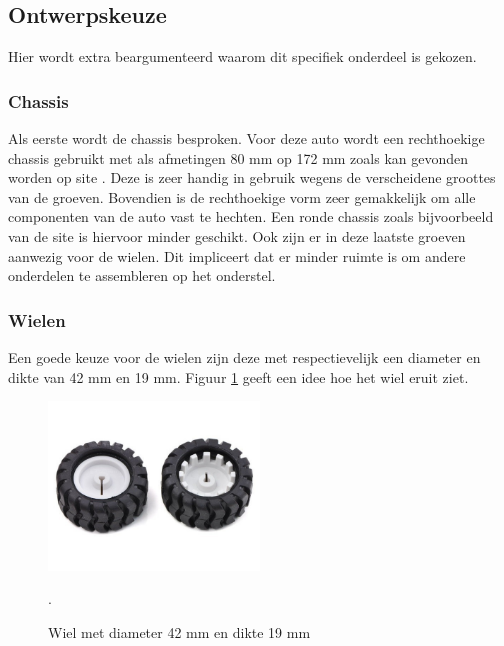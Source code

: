\documentclass[a4paper,twoside,kulak]{kulakreport} %
\begin{document}


\subsection{Ontwerpskeuze}

Hier wordt extra beargumenteerd waarom dit specifiek onderdeel is gekozen.
\label{Ontwerpskeuze}

\subsubsection{Chassis}
Als eerste wordt de chassis besproken. Voor deze auto wordt een rechthoekige chassis gebruikt met als afmetingen 80 mm op 172 mm zoals kan gevonden worden op site \cite{RobotChassisRechthoekigZwart}. %
Deze is zeer handig in gebruik wegens de verscheidene groottes van de groeven. Bovendien is de rechthoekige vorm zeer gemakkelijk om alle componenten van de auto vast te hechten. Een ronde chassis zoals bijvoorbeeld van de site \cite{RobotChassis} is hiervoor minder geschikt. Ook zijn er in deze laatste groeven aanwezig voor de wielen.%
Dit impliceert dat er minder ruimte is om andere onderdelen te assembleren op het onderstel. 
\label{Chassis}
~
\subsubsection{Wielen}
Een goede keuze voor de wielen zijn deze met respectievelijk een diameter en dikte van 42 mm en 19 mm.
Figuur \ref{fig:wiel} geeft een idee hoe het wiel eruit ziet.

\begin{figure}
	\includegraphics[width=0.5\textwidth]{wielen}
	\centering
	\caption{ Wiel met diameter 42 mm en dikte 19 mm} 
	\cite{Wiel42x19mm}.
	\label{fig:wiel}
\end{figure}
\end{document}
